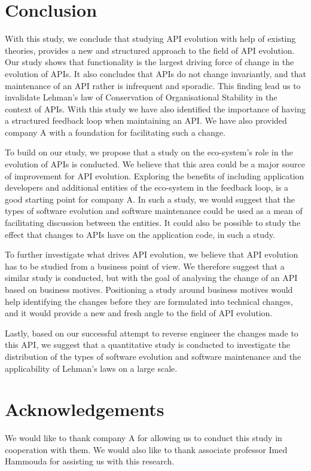 \documentclass{sig-alternate}
\begin{document}
\section{Conclusion} \label{conclusion}
With this study, we conclude that studying API evolution with help of existing theories, provides a new and structured approach to the field of API evolution. Our study shows that functionality is the largest driving force of change in the evolution of APIs. It also concludes that APIs do not change invariantly, and that maintenance of an API rather is infrequent and sporadic. This finding lead us to invalidate Lehman's law of Conservation of Organisational Stability in the context of APIs. With this study we have also identified the importance of having a structured feedback loop when maintaining an API. We have also provided company A with a foundation for facilitating such a change. 

To build on our study, we propose that a study on the eco-system's role in the evolution of APIs is conducted. We believe that this area could be a major source of improvement for API evolution. Exploring the benefits of including application developers and additional entities of the eco-system in the feedback loop, is a good starting point for company A. In such a study, we would suggest that the types of software evolution and software maintenance \cite{chapin2001types} could be used as a mean of facilitating discussion between the entities. It could also be possible to study the effect that changes to APIs have on the application code, in such a study. 

To further investigate what drives API evolution, we believe that API evolution has to be studied from a business point of view. We therefore suggest that a similar study is conducted, but with the goal of analysing the change of an API based on business motives. Positioning a study around business motives would help identifying the changes before they are formulated into technical changes, and it would provide a new and fresh angle to the field of API evolution. 

Lastly, based on our successful attempt to reverse engineer the changes made to this API, we suggest that a quantitative study is conducted to investigate the distribution of the types of software evolution and software maintenance and the applicability of Lehman's laws on a large scale. 










\section{Acknowledgements}
We would like to thank company A for allowing us to conduct this study in cooperation with them. We would also like to thank associate professor Imed Hammouda for assisting us with this research. 



 
\end{document}
